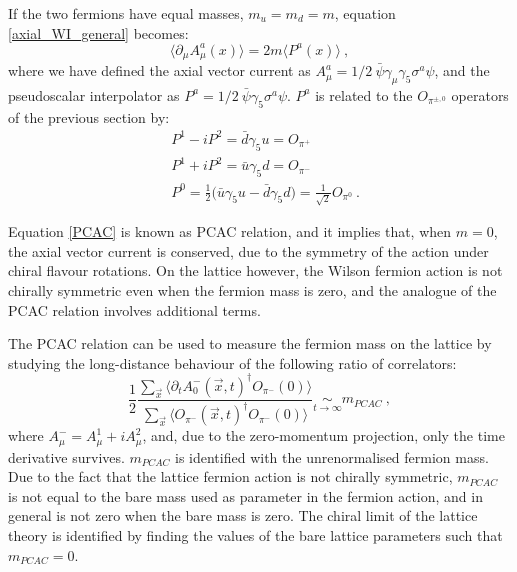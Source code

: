 If the two fermions have equal masses, $m_u = m_d = m$, equation \ref{axial_WI_general} becomes:
\begin{equation}
\langle \partial_{\mu} A^a_{\mu} (x) \rangle = 2 m \langle P^a(x) \rangle \: ,
\label{PCAC}
\end{equation}
%
where we have defined the axial vector current as $A^a_{\mu} = 1/2 \: \bar \psi \gamma_{\mu} \gamma_5 \sigma^a \psi$, and the pseudoscalar interpolator as $P^a = 1/2 \: \bar\psi \gamma_5 \sigma^a \psi$. $P^a$ is related to the $O_{\pi^{\pm,0}}$ operators of the previous section by:
\begin{equation}
\begin{split}
& P^1 - iP^2 = \bar d \gamma_5 u = O_{\pi^+} \\
& P^1 + iP^2 = \bar u \gamma_5 d = O_{\pi^-} \\
& P^0 = \frac{1}{2} \bigl( \bar u \gamma_5 u - \bar d \gamma_5 d \bigr) = \frac{1}{\sqrt 2} O_{\pi^0} \: .
\end{split}
\end{equation}

Equation \ref{PCAC} is known as PCAC relation, and it implies that, when $m=0$, the axial vector current is conserved, due to the symmetry of the action under chiral flavour rotations. On the lattice however, the Wilson fermion action is not chirally symmetric even when the fermion mass is zero, and the analogue of the PCAC relation involves additional terms.  

The PCAC relation can be used to measure the fermion mass on the lattice by studying the long-distance behaviour of the following ratio of correlators:
\begin{equation}
\frac{1}{2} \frac{\sum_{\vec x} \langle \partial_t A^-_{0}(\vec x,t)^{\dagger} O_{\pi^-}(0) \rangle}{\sum_{\vec x} \langle O_{\pi^-}(\vec x,t)^{\dagger} O_{\pi^-}(0) \rangle} \underset{t \to \infty}{\sim} m_{PCAC} \: ,
\end{equation}
%
where $A^-_{\mu} = A^1_{\mu} + iA^2_{\mu}$, and, due to the zero-momentum projection, only the time derivative survives. $m_{PCAC}$ is identified with the unrenormalised fermion mass. Due to the fact that the lattice fermion action is not chirally symmetric, $m_{PCAC}$ is not equal to the bare mass used as parameter in the fermion action, and in general is not zero when the bare mass is zero. The chiral limit of the lattice theory is identified by finding the values of the bare lattice parameters such that $m_{PCAC} = 0$.


